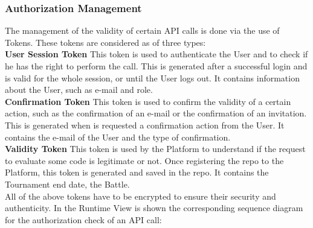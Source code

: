 \subsubsection{Authorization Management}
The management of the validity of certain API calls is done via the use of Tokens. These tokens are considered as of three types:\\
\textbf{User Session Token} This token is used to authenticate the User and to check if he has the right to perform the call. This is generated after a successful login and is valid for the whole session, or until the User logs out. It contains information about the User, such as e-mail and role. \\
\textbf{Confirmation Token} This token is used to confirm the validity of a certain action, such as the confirmation of an e-mail or the confirmation of an invitation. This is generated when is requested a confirmation action from the User. It contains the e-mail of the User and the type of confirmation. \\
\textbf{Validity Token} This token is used by the Platform to understand if the request to evaluate some code is legitimate or not. Once registering the repo to the Platform, this token is generated and saved in the repo. It contains the Tournament end date, the Battle. \\
All of the above tokens have to be encrypted to ensure their security and authenticity.
In the Runtime View is shown the corresponding sequence diagram for the authorization check of an API call: 
